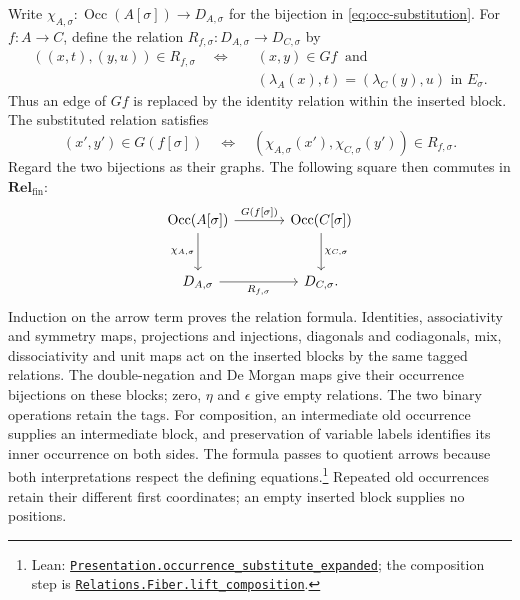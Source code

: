 \documentclass[11pt]{article}
\newcommand{\Occ}{\operatorname{Occ}}
\newcommand{\Rel}{\mathbf{Rel}_{\mathrm{fin}}}
\begin{document}
Write $\chi_{A,\sigma}:\Occ(A[\sigma])\to D_{A,\sigma}$ for
the bijection in \eqref{eq:occ-substitution}. For $f:A\to C$,
define the relation
$R_{f,\sigma}:D_{A,\sigma}\to D_{C,\sigma}$ by
\[
 \begin{aligned}
 ((x,t),(y,u))\in R_{f,\sigma}
 \quad\Longleftrightarrow\quad&
 (x,y)\in Gf\ \text{ and}\\
 &(\lambda_A(x),t)=(\lambda_C(y),u)\text{ in }E_\sigma.
 \end{aligned}
\]
Thus an edge of $Gf$ is replaced by the identity relation within
the inserted block. The substituted relation satisfies
\[
 (x',y')\in G(f[\sigma])
 \quad\Longleftrightarrow\quad
 (\chi_{A,\sigma}(x'),\chi_{C,\sigma}(y'))\in R_{f,\sigma}.
\]
Regard the two bijections as their graphs. The following square
then commutes in $\Rel$:
\[
\begin{tikzcd}[column sep=large,row sep=large]
 \Occ(A[\sigma])\arrow[r,"{G(f[\sigma])}"]
    \arrow[d,"{\chi_{A,\sigma}}"']
   &\Occ(C[\sigma])\arrow[d,"{\chi_{C,\sigma}}"]\\
 D_{A,\sigma}\arrow[r,"{R_{f,\sigma}}"']&D_{C,\sigma}.
\end{tikzcd}
\]
Induction on the arrow term proves the relation formula.
Identities, associativity and symmetry maps, projections and
injections, diagonals and codiagonals, mix, dissociativity and
unit maps act on the inserted blocks by the same tagged relations.
The double-negation and De Morgan maps give their occurrence
bijections on these blocks; zero, $\eta$ and $\epsilon$ give
empty relations. The two binary
operations retain the tags. For composition, an intermediate old
occurrence supplies an intermediate block, and preservation of
variable labels identifies its inner occurrence on both sides.
The formula passes to quotient arrows because both interpretations
respect the defining equations.\footnote{\raggedright Lean:
\href{https://github.com/flengyel/Dosen-Petric-Maximality/blob/5dbee39bea09539bd130f729e82636419f71f920/DosenPetric/PresentationSubstitutionRelation.lean\#L61}{\texttt{Presentation.\allowbreak{}occurrence\_substitute\_expanded}};
the composition step is
\href{https://github.com/flengyel/Dosen-Petric-Maximality/blob/5dbee39bea09539bd130f729e82636419f71f920/DosenPetric/SubstitutionFiberRelations.lean\#L48}{\texttt{Relations.Fiber.\allowbreak{}lift\_composition}}.}
Repeated old occurrences retain their different first coordinates;
an empty inserted block supplies no positions.
\end{document}
